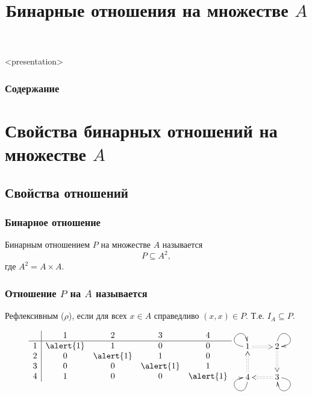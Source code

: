 


\title[$P\subseteq A^2$]{Бинарные отношения на множестве $A$}





\begin{frame}<presentation>
    \frametitle{Содержание}
    \tableofcontents
\end{frame}


\section{Свойства бинарных отношений на множестве $A$}


\subsection{Свойства отношений} 

\begin{frame}
    \frametitle{Бинарное отношение}
    
    \begin{definition}
        \alert{Бинарным отношением} $P$ на множестве $A$ называется 
        \[P\subseteq A^2,\]
        где $A^2=A\times A$.
    \end{definition}
\end{frame}

\begin{frame}
    \frametitle{Отношение $P$ на $A$ называется}
    
    \begin{definition}
        \alert{Рефлексивным ($\rho$)}, если для всех $x\in A$ справедливо $(x,x)\in P$. Т.е. $I_A\subseteq P$.
    \end{definition}    
    \[  
        \begin{matrix}
            \begin{array}{c|cccc}
                 &1&2&3&4 \\ \hline
                1&\alert{1}&1&0&0 \\
                2&0&\alert{1}&1&0 \\
                3&0&0&\alert{1}&1 \\
                4&1&0&0&\alert{1}
            \end{array}
            &\raisebox{2\height}{
                {\xymatrix{
                    1 \ar@{->}@(l,u)[] \ar@{:>}[r]
                        &2 \ar@{->}@(u,r)[] \ar@{:>}[d]
                            \\
                    4 \ar@{->}@(d,l)[] \ar@{:>}[u]
                        &3 \ar@{->}@(r,d)[] \ar@{:>}[l]
                }}
            }
        \end{matrix}
    \]
\end{frame}
    
